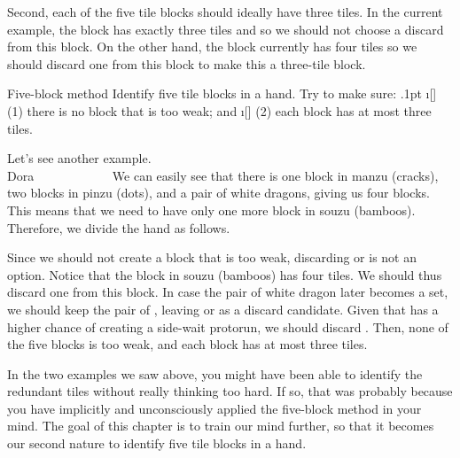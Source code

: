 \bigskip
Second, each of the five tile blocks should ideally have three tiles. In the current example, the {\LARGE{}} block has exactly three tiles and so we should not choose a discard from this block. On the other hand, the {\LARGE{}} block currently has four tiles so we should discard one from this block to make this a three-tile block. 

\vfill
\color{MyRed}
\begin{itembox}[c]{Five-block method}\normalcolor
Identify five tile blocks in a hand. Try to make sure: 
\bi\itemsep.1pt
\i[] (1) there is no block that is too weak; and 
\i[] (2) each block has at most three tiles. 
\ei
\end{itembox}\normalcolor

\newpage
Let's see another example. 
\bp
{}\bai\bai~\bai\\
\hfill\footnotesize{{\jap Dora}~~~~~~~~~~~~}
\ep
We can easily see that there is one block in {\jap manzu} (cracks), two blocks in {\jap pinzu} (dots), and a pair of white dragons, giving us four blocks. This means that we need to have only one more block in {\jap souzu} (bamboos). Therefore, we divide the hand as follows. 

\emj
Since we should not create a block that is too weak, discarding {\LARGE{}} or {\LARGE{}} is not an option. Notice that the block in {\jap souzu} (bamboos) has four tiles. We should thus discard one from this block. In case the pair of white dragon later becomes a set, we should keep the pair of {\LARGE{}}, leaving {\LARGE{}} or {\LARGE{}} as a discard candidate. Given that {\LARGE{}} has a higher chance of creating a side-wait protorun, we should discard {\LARGE{}}. 
Then, none of the five blocks is too weak, and each block has at most three tiles. 

\bigskip
In the two examples we saw above, you might have been able to identify the redundant tiles without really thinking too hard. If so, that was probably because you have implicitly and unconsciously applied the five-block method in your mind. The goal of this chapter is to train our mind further, so that it becomes our second nature to identify five tile blocks in a hand. 

